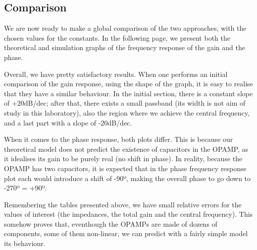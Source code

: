 \subsection{Comparison}
\label{subsec:comparison}

We are now ready to make a global comparison of the two approaches, with the chosen values for the constants. In the following page, we present both the theoretical and simulation graphs of the frequency response of the gain and the phase.

Overall, we have pretty satisfactory results. When one performs an initial comparison of the gain response, using the shape of the graph, it is easy to realise that they have a similar behaviour. In the initial section, there is a constant slope of +20dB/dec; after that, there exists a small passband (its width is not aim of study in this laboratory), also the region where we achieve the central frequency, and a last part with a slope of -20dB/dec.

When it comes to the phase response, both plots differ. This is because our theoretical model does not predict the existence of capacitors in the OPAMP, as it idealises its gain to be purely real (no shift in phase). In reality, because the OPAMP has two capacitors, it is expected that in the phase frequency response plot each would introduce a shift of -90º, making the overall phase to go down to -270º = +90º. 

Remembering the tables presented above, we have small relative errors for the values of interest (the impedances, the total gain and the central frequency). This somehow proves that, eventhough the OPAMPs are made of dozens of components, some of them non-linear, we can predict with a fairly simple model its behaviour. 

